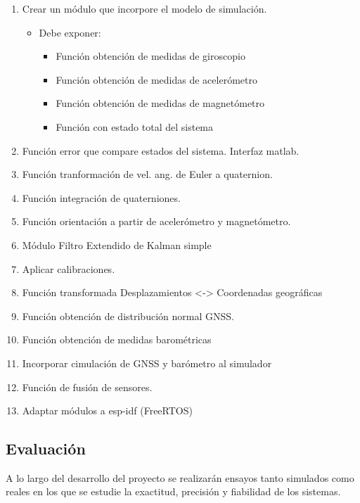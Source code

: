 \documentclass{sty/propuesta}
\begin{document}
\begin{enumerate}
    \item Crear un módulo que incorpore el modelo de simulación.
        \begin{itemize}
            \item  Debe exponer:
            \begin{itemize}
                \item Función obtención de medidas de giroscopio
                \item Función obtención de medidas de acelerómetro
                \item Función obtención de medidas de magnetómetro
                \item Función con estado total del sistema
            \end{itemize}
        \end{itemize}
        
    \item Función error que compare estados del sistema. Interfaz matlab.
    \item Función tranformación de vel. ang. de Euler a quaternion.
    \item Función integración de quaterniones.
    \item Función orientación a partir de acelerómetro y magnetómetro. \cite{PyAHRSdocs}
    \item Módulo Filtro Extendido de Kalman simple
    \item Aplicar calibraciones.
    \item Función transformada Desplazamientos <-> Coordenadas geográficas
    \item Función obtención de distribución normal GNSS. 
    \item Función obtención de medidas barométricas
    \item Incorporar cimulación de GNSS y barómetro al simulador
    \item Función de fusión de sensores.
    \item Adaptar módulos a esp-idf (FreeRTOS) \cite{esp_idf_programming_guide}
    
    
\end{enumerate}

\subsection{Evaluación}

A lo largo del desarrollo del proyecto se realizarán ensayos tanto simulados como reales en los que se estudie la exactitud, precisión y fiabilidad de los sistemas.
\end{document}
